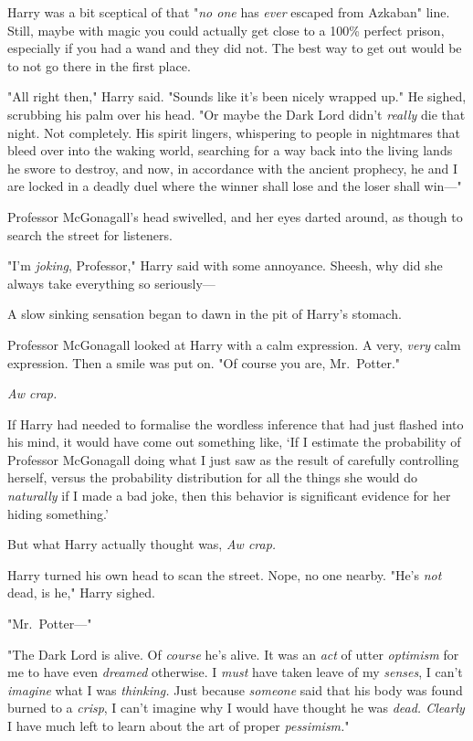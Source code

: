 Harry was a bit sceptical of that "\emph{no one} has \emph{ever} escaped from
Azkaban" line. Still, maybe with magic you could actually get close to a 100\%
perfect prison, especially if you had a wand and they did not. The best way to
get out would be to not go there in the first place.

"All right then," Harry said. "Sounds like it's been nicely wrapped up." He
sighed, scrubbing his palm over his head. "Or maybe the Dark Lord didn't
\emph{really} die that night. Not completely. His spirit lingers, whispering to
people in nightmares that bleed over into the waking world, searching for a way
back into the living lands he swore to destroy, and now, in accordance with the
ancient prophecy, he and I are locked in a deadly duel where the winner shall
lose and the loser shall win—"

Professor McGonagall's head swivelled, and her eyes darted around, as though to
search the street for listeners.

"I'm \emph{joking}, Professor," Harry said with some annoyance. Sheesh, why did
she always take everything so seriously—

A slow sinking sensation began to dawn in the pit of Harry's stomach.

Professor McGonagall looked at Harry with a calm expression. A very,
\emph{very} calm expression. Then a smile was put on. "Of course you are,
Mr.~Potter."

\emph{Aw crap.}

If Harry had needed to formalise the wordless inference that had just flashed
into his mind, it would have come out something like, `If I estimate the
probability of Professor McGonagall doing what I just saw as the result of
carefully controlling herself, versus the probability distribution for all the
things she would do \emph{naturally} if I made a bad joke, then this behavior
is significant evidence for her hiding something.'

But what Harry actually thought was, \emph{Aw crap.}

Harry turned his own head to scan the street. Nope, no one nearby. "He's
\emph{not} dead, is he," Harry sighed.

"Mr.~Potter—"

"The Dark Lord is alive. Of \emph{course} he's alive. It was an \emph{act} of
utter \emph{optimism} for me to have even \emph{dreamed} otherwise. I
\emph{must} have taken leave of my \emph{senses}, I can't \emph{imagine} what I
was \emph{thinking.} Just because \emph{someone} said that his body was found
burned to a \emph{crisp}, I can't imagine why I would have thought he was
\emph{dead. Clearly} I have much left to learn about the art of proper
\emph{pessimism.}"


